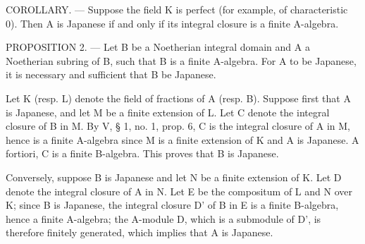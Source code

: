 COROLLARY. --- Suppose the field K is perfect (for example, of characteristic 0). Then A is Japanese if and only if its integral closure is a finite A-algebra.

PROPOSITION 2. --- Let B be a Noetherian integral domain and A a Noetherian subring of B, such that B is a finite A-algebra. For A to be Japanese, it is necessary and sufficient that B be Japanese.

Let K (resp. L) denote the field of fractions of A (resp. B). Suppose first that A is Japanese, and let M be a finite extension of L. Let C denote the integral closure of B in M. By V, § 1, no. 1, prop. 6, C is the integral closure of A in M, hence is a finite A-algebra since M is a finite extension of K and A is Japanese. A fortiori, C is a finite B-algebra. This proves that B is Japanese.

Conversely, suppose B is Japanese and let N be a finite extension of K. Let D denote the integral closure of A in N. Let E be the compositum of L and N over K; since B is Japanese, the integral closure D' of B in E is a finite B-algebra, hence a finite A-algebra; the A-module D, which is a submodule of D', is therefore finitely generated, which implies that A is Japanese.

